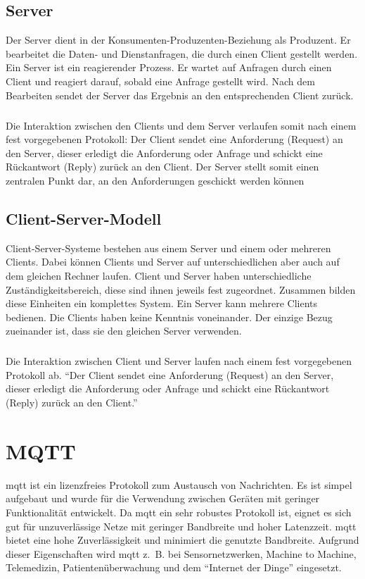 \subsection{Server}
Der Server dient in der Konsumenten-Produzenten-Beziehung als Produzent. Er
bearbeitet die Daten- und Dienstanfragen, die durch einen Client gestellt
werden. Ein Server ist ein reagierender Prozess. Er wartet auf Anfragen durch
einen Client und reagiert darauf, sobald eine Anfrage gestellt wird. Nach dem
Bearbeiten sendet der Server das Ergebnis an den entsprechenden Client zurück.

\subparagraph{}
Die Interaktion zwischen den Clients und
dem Server verlaufen somit nach einem fest vorgegebenen Protokoll: Der Client
sendet eine Anforderung (Request) an den Server, dieser erledigt die Anforderung
oder Anfrage und schickt eine Rückantwort (Reply) zurück an den Client. Der
Server stellt somit einen zentralen Punkt dar, an den Anforderungen geschickt
werden können
\cite{Bengel2015}

\subsection{Client-Server-Modell}
Client-Server-Systeme bestehen aus einem Server und einem oder mehreren Clients.
Dabei können Clients und Server auf unterschiedlichen aber auch auf dem gleichen
Rechner laufen. Client und Server haben unterschiedliche Zuständigkeitsbereich,
diese sind ihnen jeweils fest zugeordnet. Zusammen bilden diese Einheiten ein
komplettes System. Ein Server kann mehrere Clients bedienen. Die Clients haben
keine Kenntnis voneinander. Der einzige Bezug zueinander ist, dass sie den
gleichen Server verwenden.

\subparagraph{}
Die Interaktion zwischen Client und Server laufen nach einem fest vorgegebenen
Protokoll ab. "`Der Client sendet eine Anforderung (Request) an den Server,
dieser erledigt die Anforderung oder Anfrage und schickt eine Rückantwort
(Reply) zurück an den Client."'
\cite{Bengel2015}

\section{MQTT}\label{sec:mqtt}
\ac{mqtt} ist ein lizenzfreies Protokoll zum Austausch von Nachrichten. Es ist
simpel aufgebaut und wurde für die Verwendung zwischen Geräten mit geringer
Funktionalität entwickelt. Da \ac{mqtt} ein sehr robustes Protokoll ist, eignet
es sich gut für unzuverlässige Netze mit geringer Bandbreite und hoher
Latenzzeit. \ac{mqtt} bietet eine hohe Zuverlässigkeit und minimiert die
genutzte Bandbreite. Aufgrund dieser Eigenschaften wird \ac{mqtt} z.~B.
bei Sensornetzwerken, Machine to Machine, Telemedizin, Patientenüberwachung und
dem "`Internet der Dinge"' eingesetzt.

